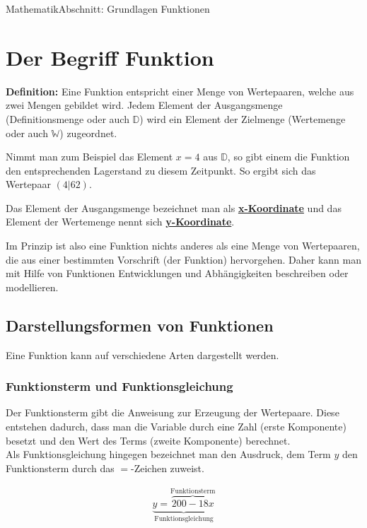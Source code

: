 \documentclass[11pt,twocolumn,oneside,openany,headings=optiontotoc,11pt,numbers=noenddot]{article}
\begin{document}
\begin{worksheet}{}{Mathematik}{Abschnitt: Grundlagen Funktionen}
		\section{Der Begriff \glqq{}Funktion\grqq{}}
		\begin{framed}
			\noindent
			\textbf{Definition:} Eine Funktion entspricht einer Menge von Wertepaaren, welche aus zwei Mengen gebildet wird. Jedem Element der Ausgangsmenge (Definitionsmenge oder auch \(\mathbb{D}\)) wird ein Element der Zielmenge (Wertemenge oder auch \(\mathbb{W}\)) zugeordnet.
		\end{framed}
		\noindent
		Nimmt man zum Beispiel das Element \(x=4\) aus \(\mathbb{D}\), so gibt einem die Funktion den entsprechenden Lagerstand zu diesem Zeitpunkt. So ergibt sich das Wertepaar \((4|62)\).\\
		\par\bigskip\noindent
		Das Element der Ausgangsmenge bezeichnet man als \underline{\textbf{x-Koordinate}} und das Element der Wertemenge nennt sich \underline{\textbf{y-Koordinate}}.\\
		\par\bigskip\noindent
		Im Prinzip ist also eine Funktion nichts anderes als eine Menge von Wertepaaren, die aus einer bestimmten Vorschrift (der Funktion) hervorgehen. Daher kann man mit Hilfe von Funktionen Entwicklungen und Abhängigkeiten beschreiben oder modellieren.
		\subsection{Darstellungsformen von Funktionen}
		Eine Funktion kann auf verschiedene Arten dargestellt werden.
		\subsubsection*{Funktionsterm und Funktionsgleichung}
		Der Funktionsterm gibt die Anweisung zur Erzeugung der Wertepaare. Diese entstehen dadurch, dass man die Variable durch eine Zahl (erste Komponente) besetzt und den Wert des Terms (zweite Komponente) berechnet.\\
		Als Funktionsgleichung hingegen bezeichnet man den Ausdruck, dem Term \(y\) den Funktionsterm durch das \glqq{}\(=\)\grqq{}-Zeichen zuweist.\\
		\par\bigskip\noindent
		\begin{align*}
			\underbrace{y = \overbrace{200 -18x}^{\text{Funktionsterm}}}_{\text{Funktionsgleichung}}
		\end{align*}

\end{worksheet}
\end{document}
